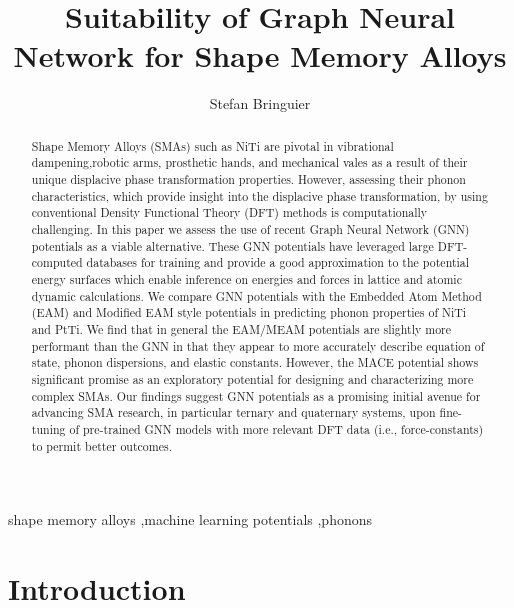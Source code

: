 \documentclass[preprint,colorlinks=true,linkcolor=black,citecolor=black]{elsarticle}
\begin{document}
\title{Suitability of Graph Neural Network for Shape Memory Alloys}

\author[1]{Stefan
	Bringuier}
 

\begin{abstract}
	Shape Memory Alloys (SMAs) such as NiTi are pivotal in vibrational
	dampening,robotic arms, prosthetic hands, and mechanical vales as a
	result of their unique displacive phase transformation
	properties. However, assessing their phonon characteristics, which
	provide insight into the displacive phase transformation, by using
	conventional Density Functional Theory (DFT) methods is
	computationally challenging. In this paper we assess the use of
	recent Graph Neural Network (GNN) potentials as a viable
	alternative. These GNN potentials have leveraged large DFT-computed
	databases for training and provide a good approximation to the
	potential energy surfaces which enable inference on energies and
	forces in lattice and atomic dynamic calculations. We compare GNN
	potentials with the Embedded Atom Method (EAM) and Modified EAM
	style potentials in predicting phonon properties of NiTi and
	PtTi. We find that in general the EAM/MEAM potentials are slightly
	more performant than the GNN in that they appear to more accurately
	describe equation of state, phonon dispersions, and elastic
	constants. However, the MACE potential shows significant promise as
	an exploratory potential for designing and characterizing more
	complex SMAs. Our findings suggest GNN potentials as a promising
	initial avenue for advancing SMA research, in particular ternary and
	quaternary systems, upon fine-tuning of pre-trained GNN models with
	more relevant DFT data (i.e., force-constants) to permit better
	outcomes.
\end{abstract}

\begin{keyword}
	shape memory alloys \sep machine learning potentials \sep phonons
\end{keyword}

\maketitle

\section{Introduction}
\label{sec:intro}
\end{document}
